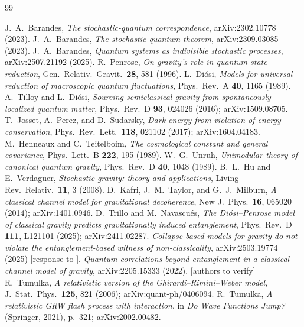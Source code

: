 \documentclass[aps,prd,preprint,amsmath,amssymb,nofootinbib,superscriptaddress]{revtex4-2}
\begin{document}
\begin{thebibliography}{99}

 J.~A.~Barandes, \textit{The stochastic-quantum correspondence}, arXiv:2302.10778 (2023).
 J.~A.~Barandes, \textit{The stochastic-quantum theorem}, arXiv:2309.03085 (2023).
 J.~A.~Barandes, \textit{Quantum systems as indivisible stochastic processes}, arXiv:2507.21192 (2025).
 R.~Penrose, \textit{On gravity's role in quantum state reduction}, Gen.\ Relativ.\ Gravit.\ \textbf{28}, 581 (1996).
 L.~Di\'osi, \textit{Models for universal reduction of macroscopic quantum fluctuations}, Phys.\ Rev.\ A \textbf{40}, 1165 (1989).
 A.~Tilloy and L.~Di\'osi, \textit{Sourcing semiclassical gravity from spontaneously localized quantum matter}, Phys.\ Rev.\ D \textbf{93}, 024026 (2016); arXiv:1509.08705.
 T.~Josset, A.~Perez, and D.~Sudarsky, \textit{Dark energy from violation of energy conservation}, Phys.\ Rev.\ Lett.\ \textbf{118}, 021102 (2017); arXiv:1604.04183.
 M.~Henneaux and C.~Teitelboim, \textit{The cosmological constant and general covariance}, Phys.\ Lett.\ B \textbf{222}, 195 (1989).
 W.~G.~Unruh, \textit{Unimodular theory of canonical quantum gravity}, Phys.\ Rev.\ D \textbf{40}, 1048 (1989).
 B.~L.~Hu and E.~Verdaguer, \textit{Stochastic gravity: theory and applications}, Living Rev.\ Relativ.\ \textbf{11}, 3 (2008).
 D.~Kafri, J.~M.~Taylor, and G.~J.~Milburn, \textit{A classical channel model for gravitational decoherence}, New J.\ Phys.\ \textbf{16}, 065020 (2014); arXiv:1401.0946.
 D.~Trillo and M.~Navascu\'es, \textit{The Di\'osi--Penrose model of classical gravity predicts gravitationally induced entanglement}, Phys.\ Rev.\ D \textbf{111}, L121101 (2025); arXiv:2411.02287.
 \textit{Collapse-based models for gravity do not violate the entanglement-based witness of non-classicality}, arXiv:2503.19774 (2025) [response to \cite{Trillo2025}].
 \textit{Quantum correlations beyond entanglement in a classical-channel model of gravity}, arXiv:2205.15333 (2022). [authors to verify]
 R.~Tumulka, \textit{A relativistic version of the Ghirardi--Rimini--Weber model}, J.\ Stat.\ Phys.\ \textbf{125}, 821 (2006); arXiv:quant-ph/0406094.
 R.~Tumulka, \textit{A relativistic GRW flash process with interaction}, in \textit{Do Wave Functions Jump?} (Springer, 2021), p.~321; arXiv:2002.00482.

\end{thebibliography}
\end{document}
